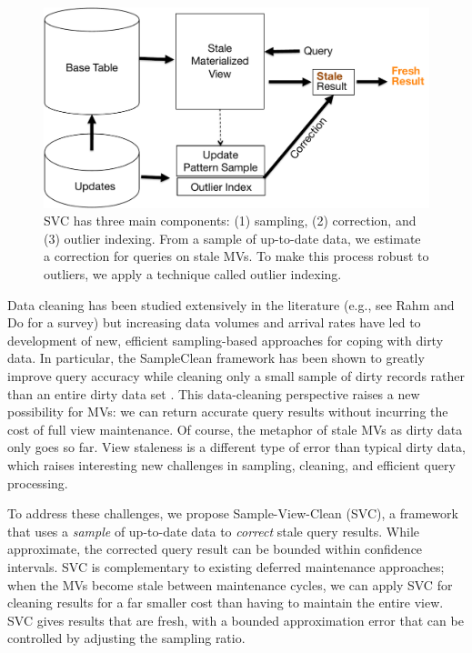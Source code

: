 \begin{figure}[t] \vspace{-2em}
\centering
 \includegraphics[scale=0.30]{figs/sys-arch.pdf} \vspace{-.25em}
 \caption{SVC has three main components: (1) sampling, (2) correction, and (3) outlier indexing. From a sample of up-to-date data, we estimate
 a correction for queries on stale MVs. To make this process robust to outliers, we apply a technique called outlier indexing. \label{sys-arch}}\vspace{-1.75em}
\end{figure}

Data cleaning has been studied extensively in the literature (e.g., see Rahm and Do for a survey\cite{rahm2000data}) but increasing data volumes and arrival rates have led to development of new, efficient sampling-based approaches for coping with dirty data.   In particular, the SampleClean framework has been shown to greatly improve query accuracy while cleaning only a small sample of dirty records rather than an entire dirty data set \cite{wang1999sample}.  This data-cleaning perspective raises a new possibility for MVs: we can return accurate query results without incurring the cost of full view maintenance.   Of course, the metaphor of stale MVs as dirty data only goes so far. View staleness is a different type of error than typical dirty data, which raises interesting new challenges in sampling, cleaning, and efficient query processing.

To address these challenges, we propose Sample-View-Clean (SVC), a framework that uses a \emph{sample} of up-to-date data to \emph{correct} stale query results.  While approximate, the corrected query result can be bounded within confidence intervals.
SVC is complementary to existing deferred maintenance approaches; when the MVs become stale between maintenance cycles, we can apply SVC for cleaning results for a far smaller cost than having to maintain the entire view.
SVC gives results that are fresh, with a bounded approximation error that can be controlled by adjusting the sampling ratio.


